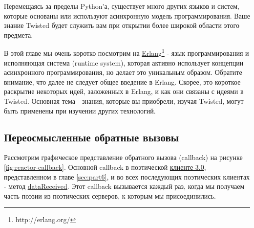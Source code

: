 Перемещаясь за пределы Python'а, существует 
много других языков и систем, которые основаны или 
используют асинхронную модель программирования. Ваше 
знание Twisted будет служить вам при открытии более 
широкой области этого предмета.


В этой главе мы очень коротко посмотрим на 
\href{http://erlang.org/}{Erlang}\footnote[1]{http://erlang.org/} -  
язык программирования и исполняющая система (runtime system), которая активно 
использует концепции асинхронного программирования, но делает 
это уникальным образом. Обратите внимание, что далее не следует  
общее введение в Erlang. Скорее, это короткое раскрытие некоторых 
идей, заложенных в Erlang, и как они связаны с идеями в Twisted. 
Основная тема - знания, которые вы приобрели, изучая Twisted, 
могут быть применены при изучении других технологий.



\subsection{Переосмысленные обратные вызовы}

Рассмотрим графическое 
представление обратного вызова (callback) на рисунке \ref{fig:reactor-callback}. Основной callback в 
поэтической 
\href{http://github.com/jdavisp3/twisted-intro/blob/master/twisted-client-3/get-poetry.py#L1}{клиенте 3.0}, 
представленном в главе \ref{sec:part6}, и во всех 
последующих поэтических клиентах - метод 
\href{http://github.com/jdavisp3/twisted-intro/blob/master/twisted-client-3/get-poetry.py#L56}{dataReceived}. 
Этот callback вызывается каждый раз, когда мы получаем 
часть поэзии из поэтических серверов, к которым мы 
присоединились.


